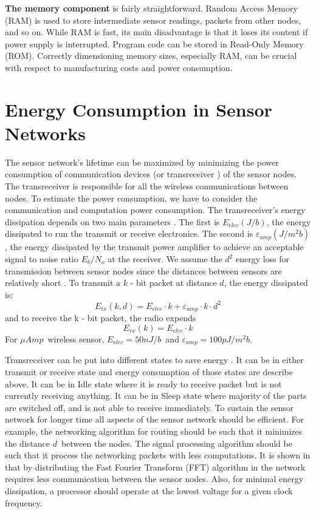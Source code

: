 	\textbf{The memory component} is fairly straightforward. 
		Random Access Memory (RAM) is used to store intermediate sensor readings, packets from other nodes, and so on. 
		While RAM is fast, its main disadvantage is that it loses its content if power supply is interrupted. 
		Program code can be stored in Read-Only Memory (ROM). 
		Correctly dimensioning memory sizes, especially RAM, can be crucial with respect to manufacturing costs and power consumption.

\section{Energy Consumption in Sensor Networks}

	The sensor network's lifetime can be maximized by minimizing the power consumption of communication devices (or transreceiver ) of the sensor nodes.
	The transreceiver is responsible for all the wireless communications between nodes.
	To estimate the power consumption, we have to consider the communication and computation power consumption.
	The transreceiver's energy dissipation depends on two main parameters \cite{wang2002energy}.
	The first is $E_{elec} (J/b)$, the energy dissipated to run the transmit or receive electronics.
	The second is $\varepsilon_{amp} (J/m^2 b)$, the energy dissipated by the transmit power amplifier to achieve an acceptable signal to noise ratio $E_{b} / N_{o} $ at the receiver.
	We assume the $d^2$ energy loss for transmission between sensor nodes since the distances between sensors are relatively short \cite{ettus1998system}. 
	To transmit a $k$ - bit packet at distance $d$, the energy dissipated is:
	\begin{equation}
		E_{tx}(k, d) = E_{elec} \cdot k + \varepsilon_{amp} \cdot k \cdot d^{2}
	\end{equation}
	and to receive the k - bit packet, the radio expends
	\begin{equation}
		E_{rx}(k) = E_{elec} \cdot k
	\end{equation}
	For $\mu Amp$\ wireless sensor, $E_{elec} = 50nJ/b$\ and $\varepsilon_{amp} = 100pJ/m^2 b$.

	Transreceiver can be put into different states to save energy \cite{karl2007protocols}.
	It can be in either transmit or receive state and energy consumption of those states are describe above.
	It can be in Idle state where it is ready to receive packet but is not currently receiving anything.
	It can be in Sleep state where majority of the parts are switched off, and is not able to receive immediately. 
 	To sustain the sensor network for longer time all aspects of the sensor network should be efficient.
	For example, the networking algorithm for routing should be such that it minimizes the distance $d$\ between the nodes.
	The signal processing algorithm should be such that it process the networking packets with less computations.
	It is shown in \cite{wang2002energy} that by distributing the Fast Fourier Transform (FFT) algorithm in the network requires less communication between the sensor nodes.
	Also, for minimal energy dissipation, a processor should operate at the lowest voltage for a given clock frequency.


